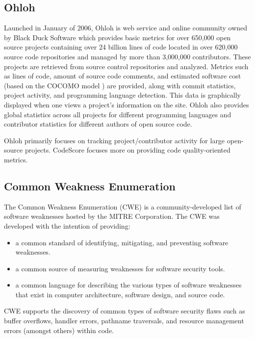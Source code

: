 \documentclass{sig-alternate}
\begin{document}
\subsection{Ohloh}
Launched in January of 2006, Ohloh \cite{allen2009ohloh} is web service and
online community owned by Black Duck Software which provides basic metrics for
over 650,000 open source projects containing over 24 billion lines of code
located in over 620,000 source code repositories and managed by more than
3,000,000 contributors. These projects are retrieved from source control
repositories and analyzed. Metrics such as lines of code, amount of source code
comments, and estimated software cost (based on the COCOMO model
\cite{boehm2000software}) are provided, along with commit statistics, project
activity, and programming language detection. This data is graphically displayed
when one views a project's information on the site. Ohloh also provides global
statistics across all projects for different programming languages and
contributor statistics for different authors of open source code. 

Ohloh primarily focuses on tracking project/contributor activity for large
open-source projects. CodeScore focuses more on providing code quality-oriented
metrics.

\subsection{Common Weakness Enumeration}
The Common Weakness Enumeration (CWE) \cite{mitre2006cwe} is a
community-developed list of software weaknesses hosted by the MITRE Corporation.
The CWE was developed with the intention of providing:

\begin{itemize}
	\item a common standard of identifying, mitigating, and preventing software weaknesses.
	\item a common source of measuring weaknesses for software security tools.
	\item a common language for describing the various types of software
		weaknesses that exist in computer architecture, software design, and
		source code.
\end{itemize}

CWE supports the discovery of common types of software security flaws such as
buffer overflows, handler errors, pathname traversals, and resource management
errors (amongst others) within code.
\end{document}
